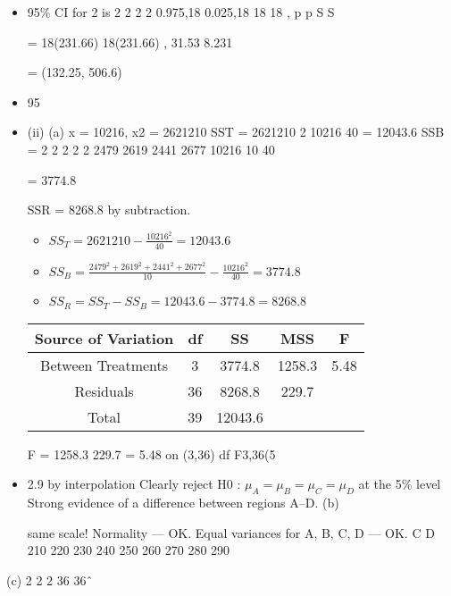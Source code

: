 \documentclass[a4paper,12pt]{article}
\begin{document}
\begin{itemize}
    \item 
 95\% CI for 2 is
2 2
2 2
0.975,18 0.025,18
18 18
, p p
 S S 
 
=
18(231.66) 18(231.66)
,
31.53 8.231


= (132.25, 506.6)
\item  95%
\item (ii) (a) x = 10216, x2 = 2621210
SST = 2621210 
2 10216
40
= 12043.6
SSB =
2 2 2 2 2 2479 2619 2441 2677 10216
10 40
  
 = 3774.8
 
 
 SSR = 8268.8 by subtraction.
\begin{itemize}
\item $SS_T = 2621210 - \frac{10216^2}{40} =  12043.6$
\item $SS_B = \frac{2479^2 + 2619^2 + 2441^2 + 2677^2}{10} - \frac{10216^2}{40} =  3774.8$
\item $SS_R = SS_T - SS_B = 12043.6 - 3774.8 = 8268.8$
\end{itemize}


\begin{center}
\begin{tabular}{|c|c|c|c|c|}
Source of Variation & df & SS & MSS & F \\ \hline
Between Treatments & 3  & 3774.8 & 1258.3 & 5.48 \\ \hline
Residuals & 36 & 8268.8 & 229.7 & \\\hline
Total & 39 & 12043.6 && \\ \hline
\end{tabular}
\end{center} 

F =
1258.3
229.7
= 5.48 on (3,36) df
F3,36(5%






\item 2.9 by interpolation
Clearly reject H0 : $\mu_A = \mu_B = \mu_C = \mu_D$ at the 5\% level
 Strong evidence of a difference between regions A–D.
(b)
\item [same scale!]
Normality — OK.
Equal variances for A, B, C, D — OK.
 C
D
210 220 230 240 250 260 270 280 290
\end{itemize}
(c)
2
2
2 36
36ˆ
~
\end{document}
